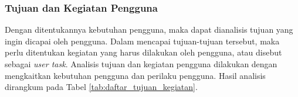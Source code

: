 \subsubsection{Tujuan dan Kegiatan Pengguna}
\label{subsubsec:tujuan_kegiatan_pengguna}

Dengan ditentukannya kebutuhan pengguna, maka dapat dianalisis tujuan yang ingin dicapai oleh pengguna. Dalam mencapai tujuan-tujuan tersebut, maka perlu ditentukan kegiatan yang harus dilakukan oleh pengguna, atau disebut sebagai \textit{user task}. Analisis tujuan dan kegiatan pengguna dilakukan dengan mengkaitkan kebutuhan pengguna dan perilaku pengguna. Hasil analisis dirangkum pada Tabel \ref{tab:daftar_tujuan_kegiatan}.

\newpage

\newlength{\cccolid}
\setlength{\cccolid}{0.09\textwidth}

\newlength{\cccolgoal}
\setlength{\cccolgoal}{0.22\textwidth}

\newlength{\cccolneed}
\setlength{\cccolneed}{0.14\textwidth}

\newcommand{\ccid}[2]{\multirow{#1}{\cccolid}{\centering\linespread{1}\selectfont #2}}
\newcommand{\ccgoal}[2]{\multirow{#1}{\cccolgoal}{\linespread{1}\selectfont #2}}
\newcommand{\ccneed}[2]{\multirow{#1}{\cccolneed}{\centering\linespread{1}\selectfont #2}}
\newcommand{\ccline}{\hhline{|~|~|-|-|~|}}


